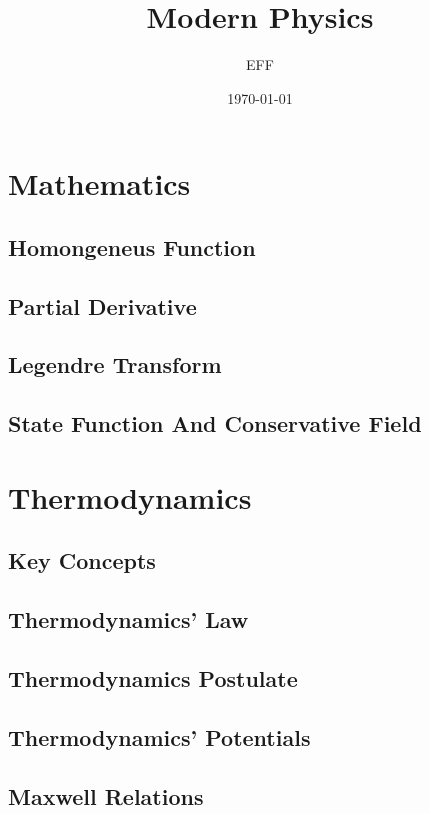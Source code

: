 \documentclass[10pt]{report}
\title{Modern Physics}
\author{EFF}
\date{\today}
\begin{document}
\pagestyle{empty}

\nocite{Boas2005}\nocite{Faisca2022}\nocite{Puri2024}\nocite{Serway2014}

\chapter*{Mathematics}
\section*{Homongeneus Function}
\clearpage

\section*{Partial Derivative}
\clearpage

\section*{Legendre Transform}
\clearpage

\section*{State Function And Conservative Field}
\clearpage

\chapter*{Thermodynamics}

\section*{Key Concepts}
\clearpage

\section*{Thermodynamics' Law}
\clearpage

\section*{Thermodynamics Postulate}
\clearpage

\section*{Thermodynamics' Potentials}
\clearpage

\section*{Maxwell Relations}
\clearpage

\printbibliography
\end{document}

